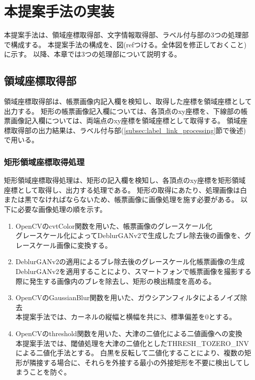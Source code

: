 \chapter{本提案手法の実装}\label{cha:Implementation}
本提案手法は、領域座標取得部、文字情報取得部、ラベル付与部の3つの処理部で構成する。
本提案手法の構成を、図(refつける。全体図を修正しておくこと)に示す。
以降、本章では3つの処理部について説明する。


\section{領域座標取得部}\label{sec:area_coords_obtainment_part}
領域座標取得部は、帳票画像内記入欄を検知し、取得した座標を領域座標として出力する。
矩形の帳票画像記入欄については、各頂点のxy座標を、下線部の帳票画像記入欄については、両端点のxy座標を領域座標として取得する。
領域座標取得部の出力結果は、ラベル付与部(\ref{subsec:label_link_processing}節で後述)で用いる。


\subsection{矩形領域座標取得処理}\label{subsec:rect_coords_obtainment_processing}
矩形領域座標取得処理は、矩形の記入欄を検知し、各頂点のxy座標を矩形領域座標として取得し、出力する処理である。
矩形の取得にあたり、処理画像は白または黒でなければならないため、帳票画像に画像処理を施す必要がある。
以下に必要な画像処理の順を示す。

\begin{enumerate}
    \item OpenCVのcvtColor関数を用いた、帳票画像のグレースケール化\\
        グレースケール化によってDeblurGANv2で生成したブレ除去後の画像を、グレースケール画像に変換する。
    \item DeblurGANv2の適用によるブレ除去後のグレースケール化帳票画像の生成\\
        DeblurGANv2を適用することにより、スマートフォンで帳票画像を撮影する際に発生する画像内のブレを除去し、矩形の検出精度を高める。
    \item OpenCVのGaussianBlur関数を用いた、ガウシアンフィルタによるノイズ除去\\
        本提案手法では、カーネルの縦幅と横幅を共に3、標準偏差を0とする。
    \item OpenCVのthreshold関数を用いた、大津の二値化による二値画像への変換\\
        本提案手法では、閾値処理を大津の二値化としたTHRESH\_TOZERO\_INVによる二値化手法とする。
        白黒を反転して二値化することにより、複数の矩形が隣接する場合に、それらを外接する最小の外接矩形を不要に検出してしまうことを防ぐ。
\end{enumerate}

